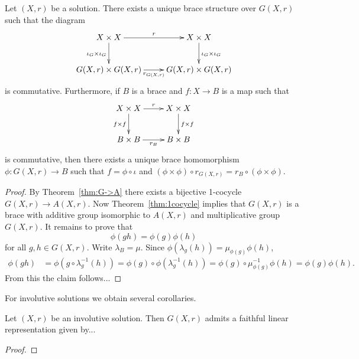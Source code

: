 \begin{theorem}
\label{thm:G(X,r)} 
    Let $(X,r)$ be a solution. There exists a unique brace 
    structure over $G(X,r)$ such
    that the diagram
    \[
    \xymatrix{
    X\times X
    \ar[d]_{\iota_G\times\iota_G}
    \ar[r]^r
    & X\times X
    \ar[d]^{\iota_G\times\iota_G}
    \\
    G(X,r)\times G(X,r)
    \ar[r]_{r_{G(X,r)}}
    & G(X,r)\times G(X,r)
    }
    \]
    is commutative. 
    Furthermore, if $B$ is a brace and $f\colon X\to B$ is a map such
    that 
    \[
    \xymatrix{
    X\times X
    \ar[d]_{f\times f}
    \ar[r]^r
    & X\times X
    \ar[d]^{f\times f}
    \\
    B\times B
    \ar[r]_{r_{B}}
    & B\times B
    }
    \]
    is commutative, 
    then there exists a unique brace
    homomorphism $\phi\colon G(X,r)\to B$ such that $f=\phi\circ \iota$ and
    $(\phi\times\phi)\circ r_{G(X,r)}=r_B\circ (\phi\times\phi)$.  
\end{theorem}

\begin{proof} 
    By Theorem~\ref{thm:G->A} there exists a bijective 1-cocycle $G(X,r)\to A(X,r)$. Now Theorem~\ref{thm:1cocycle}
    implies that $G(X,r)$ is a brace with additive group isomorphic to $A(X,r)$ and multiplicative group $G(X,r)$. 
    It remains to prove that 
    \[
        \phi(gh)=\phi(g)\phi(h)
    \]
    for all $g,h\in G(X,r)$. 
    Write $\lambda_B=\mu$. Since $\phi(\lambda_g(h))=\mu_{\phi(g)}\phi(h)$, 
    \begin{align*}
        \phi(gh)&=\phi(g\circ\lambda^{-1}_g(h))
        =\phi(g)\circ \phi(\lambda_g^{-1}(h))
        =\phi(g)\circ\mu^{-1}_{\phi(g)}\phi(h)
        =\phi(g)\phi(h).
    \end{align*}
    From this the claim follows...
\end{proof}

For involutive solutions we obtain several corollaries.

\begin{corollary}
    Let $(X,r)$ be an involutive solution. Then $G(X,r)$ admits a faithful linear representation
    given by...
\end{corollary}

\begin{proof}

\end{proof}

